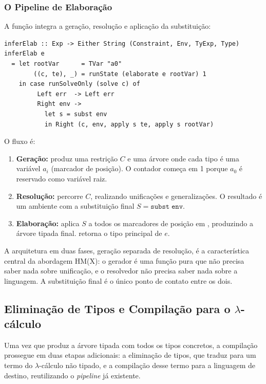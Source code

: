   \subsubsection{O Pipeline de Elaboração}

  A função  integra a
  geração, resolução e aplicação da substituição:

\begin{verbatim}
inferElab :: Exp -> Either String (Constraint, Env, TyExp, Type)
inferElab e
  = let rootVar      = TVar "a0"
        ((c, te), _) = runState (elaborate e rootVar) 1
    in case runSolveOnly (solve c) of
         Left err  -> Left err
         Right env ->
           let s = subst env
           in Right (c, env, apply s te, apply s rootVar)
\end{verbatim}

  O fluxo é:

  \begin{enumerate}
    \item
      \textbf{Geração:} 
      produz uma restrição \(C\) e uma árvore
       onde cada tipo é uma variável
      \(a_i\) (marcador de posição). O contador começa em 1 porque
      \(a_0\) é reservado como variável raiz.
    \item
      \textbf{Resolução:}  percorre
      \(C\), realizando unificações e generalizações. O resultado é um
      ambiente  com a substituição final
      \(S = \mathtt{subst\; env}\).
    \item
      \textbf{Elaboração:}  aplica
      \(S\) a todos os marcadores de posição em
      , produzindo a árvore tipada final.
       retorna o tipo principal de \(e\).
  \end{enumerate}

  A arquitetura em duas fases, geração separada de resolução, é a
  característica central da abordagem HM(X): o gerador é uma função
  pura que não precisa saber nada sobre unificação, e o resolvedor não
  precisa saber nada sobre a linguagem. A substituição final é o único
  ponto de contato entre os dois.

  \subsection{Eliminação de Tipos e Compilação para o $\lambda$-cálculo}

  Uma vez que  produz a árvore tipada
   com todos os tipos concretos, a compilação
  prossegue em duas etapas adicionais: a eliminação de tipos, que
  traduz  para um termo do $\lambda$-cálculo não tipado, e a
  compilação desse termo para a linguagem de destino, reutilizando o
  \emph{pipeline} já existente.

